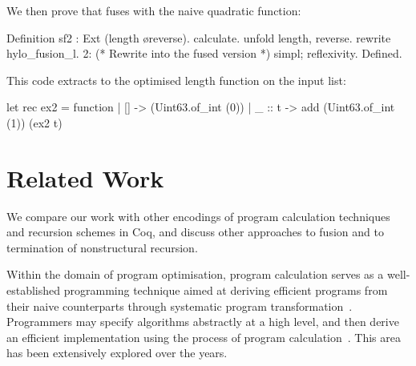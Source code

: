 \documentclass[a4paper,anonymous, UKenglish,cleveref, autoref, thm-restate]{lipics-v2021}
\begin{document}
\noindent
We then prove that  fuses with
the naive quadratic  function:
\begin{coqcode}
Definition sf2 : Ext (length \o reverse).
  calculate.  unfold length, reverse. rewrite hylo_fusion_l.
  2:{ (* Rewrite into the fused version *) }
  simpl; reflexivity.
Defined.
\end{coqcode}
This code extracts to the optimised length function on the input list:
\begin{ocamlcode}
let rec ex2 = function | [] -> (Uint63.of_int (0))
                       | _ :: t -> add (Uint63.of_int (1)) (ex2 t)
\end{ocamlcode}

\section{Related Work}
\label{sec:related-work}

%
We compare our work with other
encodings of program calculation techniques and recursion schemes in Coq, and
discuss other approaches to fusion and to termination of nonstructural
recursion.

Within the domain of program optimisation, program calculation serves as a
well-established programming technique aimed at deriving efficient programs from
their naive counterparts through systematic program
transformation~\cite{gibbonsSquiggol}. Programmers may specify algorithms
abstractly at a high level, and then derive an efficient implementation using
the process of program calculation~\cite{BirddeMoor96:Algebra}. This area has
been extensively explored over the years.
\end{document}
